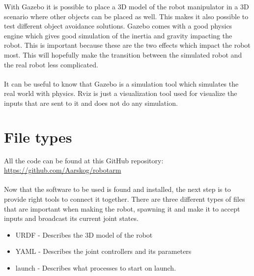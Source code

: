 With Gazebo it is possible to place a 3D model of the robot manipulator in a 3D scenario where other objects can be placed as well. This makes it also possible to test different object avoidance solutions. Gazebo comes with a good physics engine which gives good simulation of the inertia and gravity impacting the robot\cite{Gazebo}. This is important because these are the two effects which impact the robot most. This will hopefully make the transition between the simulated robot and the real robot less complicated. \\\\
It can be useful to know that Gazebo is a simulation tool which simulates the real world with physics. Rviz is just a visualization tool used for visualize the inputs that are sent to it and does not do any simulation. 









\section{File types}
All the code can be found at this GitHub repository: \href{https://github.com/Aarskog/robotarm}{\underline{https://github.com/Aarskog/robotarm}}\\\\
Now that the software to be used is found and installed, the next step is to provide right tools to connect it together. There are three different types of files that are important when making the robot, spawning it and make it to accept inputs and broadcast its current joint states. 
\begin{itemize}
    \item URDF - Describes the 3D model of the robot
    \item YAML - Describes the joint controllers and its parameters
    \item launch - Describes what processes to start on launch.
\end{itemize}

